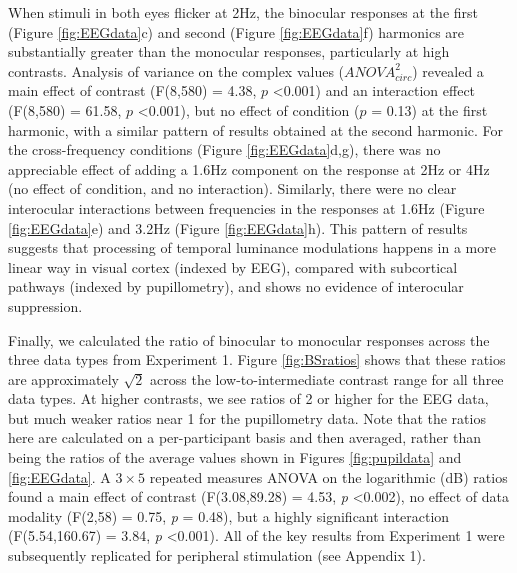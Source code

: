 \documentclass[
]{article}
\begin{document}
When stimuli in both eyes flicker at 2Hz, the binocular responses at the first (Figure \ref{fig:EEGdata}c) and second (Figure \ref{fig:EEGdata}f) harmonics are substantially greater than the monocular responses, particularly at high contrasts. Analysis of variance on the complex values (\(ANOVA^2_{circ}\)) revealed a main effect of contrast (F(8,580) = 4.38, \(p\) \textless0.001) and an interaction effect (F(8,580) = 61.58, \(p\) \textless0.001), but no effect of condition (\(p\) = 0.13) at the first harmonic, with a similar pattern of results obtained at the second harmonic. For the cross-frequency conditions (Figure \ref{fig:EEGdata}d,g), there was no appreciable effect of adding a 1.6Hz component on the response at 2Hz or 4Hz (no effect of condition, and no interaction). Similarly, there were no clear interocular interactions between frequencies in the responses at 1.6Hz (Figure \ref{fig:EEGdata}e) and 3.2Hz (Figure \ref{fig:EEGdata}h). This pattern of results suggests that processing of temporal luminance modulations happens in a more linear way in visual cortex (indexed by EEG), compared with subcortical pathways (indexed by pupillometry), and shows no evidence of interocular suppression.

Finally, we calculated the ratio of binocular to monocular responses across the three data types from Experiment 1. Figure \ref{fig:BSratios} shows that these ratios are approximately \(\sqrt2\) across the low-to-intermediate contrast range for all three data types. At higher contrasts, we see ratios of 2 or higher for the EEG data, but much weaker ratios near 1 for the pupillometry data. Note that the ratios here are calculated on a per-participant basis and then averaged, rather than being the ratios of the average values shown in Figures \ref{fig:pupildata} and \ref{fig:EEGdata}. A \(3 \times 5\) repeated measures ANOVA on the logarithmic (dB) ratios found a main effect of contrast (F(3.08,89.28) = 4.53, \emph{p} \textless0.002), no effect of data modality (F(2,58) = 0.75, \emph{p} = 0.48), but a highly significant interaction (F(5.54,160.67) = 3.84, \emph{p} \textless0.001). All of the key results from Experiment 1 were subsequently replicated for peripheral stimulation (see Appendix 1).
\end{document}
